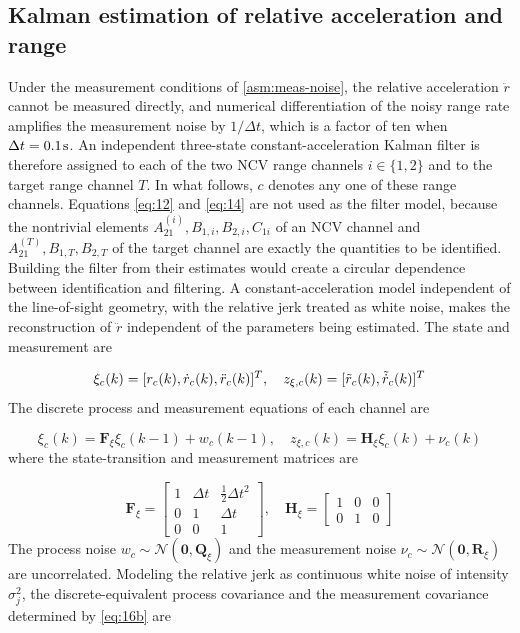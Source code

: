 \subsection{Kalman estimation of relative acceleration and range}
\label{subsec:kf}
Under the measurement conditions of \cref{asm:meas-noise}, the relative acceleration $\ddot r$ cannot be measured directly, and numerical differentiation of the noisy range rate amplifies the measurement noise by $1/\Delta t$, which is a factor of ten when $\Delta t = 0.1{\kern 1pt} {\text{s}}$. An independent three-state constant-acceleration Kalman filter is therefore assigned to each of the two NCV range channels $i \in \{1,2\}$ and to the target range channel $T$. In what follows, $c$ denotes any one of these range channels. Equations \eqref{eq:12} and \eqref{eq:14} are not used as the filter model, because the nontrivial elements $A_{21}^{(i)},B_{1,i},B_{2,i},C_{1i}$ of an NCV channel and $A_{21}^{(T)},B_{1,T},B_{2,T}$ of the target channel are exactly the quantities to be identified. Building the filter from their estimates would create a circular dependence between identification and filtering. A constant-acceleration model independent of the line-of-sight geometry, with the relative jerk treated as white noise, makes the reconstruction of $\ddot r$ independent of the parameters being estimated. The state and measurement are

\begin{equation}
\label{eq:62}
{\xi _c}(k) = {[{r_c}(k),{\dot r_c}(k),{\ddot r_c}(k)]^T},\quad {z_{\xi ,c}}(k) = {[\tilde{r}_{c}(k),\tilde{\dot{r}}_{c}(k)]^T}
\end{equation}
The discrete process and measurement equations of each channel are

\begin{equation}
\label{eq:62b}
{\xi _c}(k) = {{\mathbf{F}}_\xi }{\xi _c}(k - 1) + {w_c}(k - 1),\quad {z_{\xi ,c}}(k) = {{\mathbf{H}}_\xi }{\xi _c}(k) + {\nu _c}(k)
\end{equation}
where the state-transition and measurement matrices are

\begin{equation}
\label{eq:62c}
{{\mathbf{F}}_\xi } = \left[ {\begin{array}{*{20}{c}}
  1&{\Delta t}&{\tfrac{1}{2}\Delta {t^2}} \\ 
  0&1&{\Delta t} \\ 
  0&0&1 
\end{array}} \right],\quad {{\mathbf{H}}_\xi } = \left[ {\begin{array}{*{20}{c}}
  1&0&0 \\ 
  0&1&0 
\end{array}} \right]
\end{equation}
The process noise ${w_c}\sim \mathcal{N}({\mathbf{0}},{{\mathbf{Q}}_\xi })$ and the measurement noise ${\nu _c}\sim \mathcal{N}({\mathbf{0}},{{\mathbf{R}}_\xi })$ are uncorrelated. Modeling the relative jerk as continuous white noise of intensity $\sigma _j^2$, the discrete-equivalent process covariance and the measurement covariance determined by \eqref{eq:16b} are~\cite{barshalom2001}

